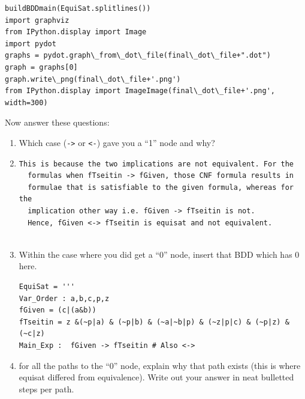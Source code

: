 \documentclass[10pt]{article}
\begin{document}
\begin{enumerate}
\begin{itemize}
\begin{Verbatim}[frame=single]
buildBDDmain(EquiSat.splitlines())
import graphviz
from IPython.display import Image
import pydot
graphs = pydot.graph\_from\_dot\_file(final\_dot\_file+".dot")
graph = graphs[0]
graph.write\_png(final\_dot\_file+'.png')
from IPython.display import ImageImage(final\_dot\_file+'.png',
width=300)
\end{Verbatim}

\end{itemize}
  
  Now answer these questions:
  
  \begin{enumerate}
  \item Which case (\verb|->| or \verb|<-|) gave you a ``1'' node and why?

  \item[] 
  \begin{Verbatim}[frame=single]
  This is because the two implications are not equivalent. For the 
  formulas when fTseitin -> fGiven, those CNF formula results in
  formulae that is satisfiable to the given formula, whereas for the
  implication other way i.e. fGiven -> fTseitin is not. 
  Hence, fGiven <-> fTseitin is equisat and not equivalent.
  
  \end{Verbatim}

  \item Within the case
    where you did  get a ``0'' node,
    insert that BDD which has 0 here.
  \begin{Verbatim}[frame=single]
EquiSat = '''
Var_Order : a,b,c,p,z
fGiven = (c|(a&b))
fTseitin = z &(~p|a) & (~p|b) & (~a|~b|p) & (~z|p|c) & (~p|z) & (~c|z)
Main_Exp :  fGiven -> fTseitin # Also <-> 
\end{Verbatim}
  \item
    for all the paths to the ``0'' node,
    explain why that path exists (this is where equisat differed from equivalence).
    Write out your answer in neat bulletted steps per path.
  
\newlength{\minpagw}
\settowidth{\minpagw}{\hspace{40em}}


\end{enumerate}
\end{enumerate}
\end{document}
